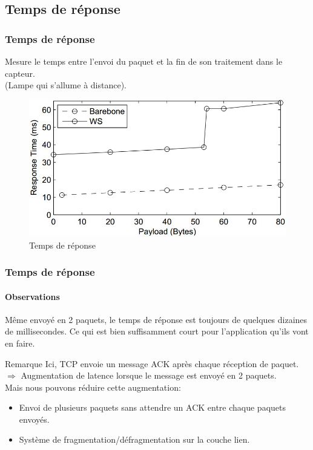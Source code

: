 \subsection{Temps de réponse}
\begin{frame}
 \frametitle{Temps de réponse}
 Mesure le temps entre l'envoi du paquet et la fin de son traitement dans le capteur.\\
 (Lampe qui s'allume à distance).
 \begin{figure}
  \centering
  \includegraphics[scale=0.35]{figures/treponse.jpg}
  \caption{Temps de réponse}
 \end{figure} 
\end{frame}
 
\begin{frame}
 \frametitle{Temps de réponse}
 \framesubtitle{Observations}
 Même envoyé en 2 paquets, le temps de réponse est toujours de quelques dizaines de millisecondes.
 Ce qui est bien suffisamment court pour l'application qu'ils vont en faire.\\
 \begin{block}{Remarque}
 Ici, TCP envoie un message ACK après chaque réception de paquet.\\
 $\Rightarrow$ Augmentation de latence lorsque le message est envoyé en 2 paquets.\\
 Mais nous pouvons réduire cette augmentation:
 \begin{itemize}
  \item Envoi de plusieurs paquets sans attendre un ACK entre chaque paquets envoyés.
  \item Système de fragmentation/défragmentation sur la couche lien.
 \end{itemize}
 \end{block}
\end{frame}